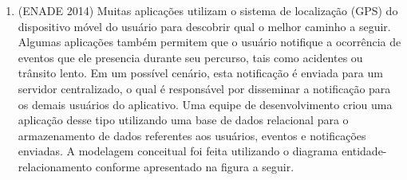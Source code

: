 \documentclass[12pt,a4paper]{article}
\begin{document}
\begin{enumerate}
\begin{enumerate}[label=\Alph*)]
    \item \textbf{PET}(\underline{codigo}: inteiro, nome: texto, data\_nascimento: data) \\
    \textbf{PESSOA}(\underline{cpf}: texto, nome: texto, codigo\_pet: inteiro) \\
    \textit{codigo\_pet referencia PET(codigo)} \\
    \textbf{TIPO\_PET}(\underline{codigo}: inteiro, descricao: texto, codigo\_pet: inteiro) \\
    \textit{codigo\_pet referencia PET(codigo)}
    
    \item \textbf{TIPO\_PET}(\underline{codigo}: inteiro, descricao: texto) \\
    \textbf{PET}(\underline{codigo}: inteiro, nome: texto, data\_nascimento: data, codigo\_tipo\_pet: inteiro) \\
    \textit{codigo\_tipo\_pet referencia TIPO\_PET(codigo)} \\
    \textbf{PESSOA}(\underline{cpf}: texto, nome: texto, codigo\_pet: inteiro) \\
    \textit{codigo\_pet referencia PET(codigo)}
    
    \item \textbf{PET\_PESSOA}(\underline{codigo\_pet}: inteiro, nome\_pet: texto, data\_nascimento: data, \underline{cpf}: texto, nome\_pessoa: texto, codigo\_tipo\_pet: inteiro, descricao\_tipo\_pet: texto)
    
    \item \textbf{PESSOA}(\underline{cpf}: texto, nome: texto) \\
    \textbf{PET}(\underline{codigo}: inteiro, nome: texto, data\_nascimento: data, codigo\_tipo\_pet: inteiro, descricao\_tipo\_pet, adotante: texto) \\
    \textit{adotante referencia PESSOA(cpf)}
\end{enumerate}

\vspace{0.8cm}

 \item (ENADE 2014) Muitas aplicações utilizam o sistema de localização (GPS) do dispositivo móvel do usuário para descobrir qual o melhor caminho a seguir. Algumas aplicações também permitem que o usuário notifique a ocorrência de eventos que ele presencia durante seu percurso, tais como acidentes ou trânsito lento. Em um possível cenário, esta notificação é enviada para um servidor centralizado, o qual é responsável por disseminar a notificação para os demais usuários do aplicativo. Uma equipe de desenvolvimento criou uma aplicação desse tipo utilizando uma base de dados relacional para o armazenamento de dados referentes aos usuários, eventos e notificações enviadas. A modelagem conceitual foi feita utilizando o diagrama entidade-relacionamento conforme apresentado na figura a seguir.


\end{enumerate}
\end{document}
